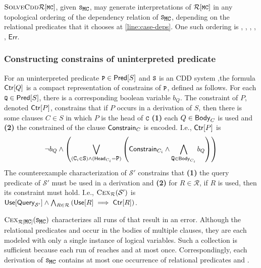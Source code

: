 %
\begin{ex}
  $\solvecdd{ \mcpreds }$, given $\mcchc$, may generate
  interpretations of $\mcpreds$ in any topological ordering of the
  dependency relation of $\mcchc$, depending on the relational
  predicates that it chooses at \autoref{line:case-deps}.
  One such ordering is , , , , ,
  $\mathsf{Err}$.
\end{ex}

\subsubsection{Constructing constrains of uninterpreted 
predicate}
%
For an uninterpreted predicate $\cc{P} \in \predof{S}$ and $\cc{S}$ is an CDD system  
,the formula $\mathsf{Ctr}[Q]$ is a compact representation of constrains of $\cc{P}$, defined as follows.
For each $\cc{Q} \in \predof{S}$, there is a corresponding boolean variable
$b_Q$.
The constraint of $P$, denoted $\mathsf{Ctr}[P]$, constrains
that if $P$ occurs in a derivation of $S$, then there is
some clauses $C \in S$ in which $P$ is the head of $\cc{C}$
\textbf{(1)} each $Q \in \mathsf{Body}_{C}$ is used and 
\textbf{(2)} the constrained of the clause $\mathsf{Constrain}_{C}$ is encoded.
%
I.e., $\mathsf{Ctr}[P]$ is
\[\lnot b_Q \land 
\left(
\biglor_{ (\cc{C}_i \in \cc{S}) \land (\headof{C_i} = \cc{P})}
\left( \consof{C_i} \land %
\bigland_{ \cc{Q} \in \bodyof{C_i}} %
b_Q \right) \right)
\]
%
The counterexample characterization of $\mathcal{S'}$ constrains that
\textbf{(1)} the query predicate of $\mathcal{S'}$ must be used in a
derivation and %
\textbf{(2)} for $R \in \mathcal{R}$, if $R$ is used, then its
constraint must hold.
%
I.e., $\textsc{Cex}_{ \mathcal{R} }(\mathcal{S'})$ is $\used{
  \queryof{\mathcal{S'} } } \land %
\bigland_{R \in \mathcal{R} } \left( \used{R} \implies \ctrof{R}
\right)$.


\begin{ex}
  $\vc{ \mcpreds }(\mcchc)$ characterizes all runs of 
  that result in an error.
  Although the relational predicates  and  occur in the
  bodies of multiple clauses, they are each modeled with only a single
  instance of logical variables.
  Such a collection is sufficient because each run of 
  reaches  and  at most once.
  Correspondingly, each derivation of $\mcchc$ contains at most one
  occurrence of relational predicates  and .
\end{ex}

